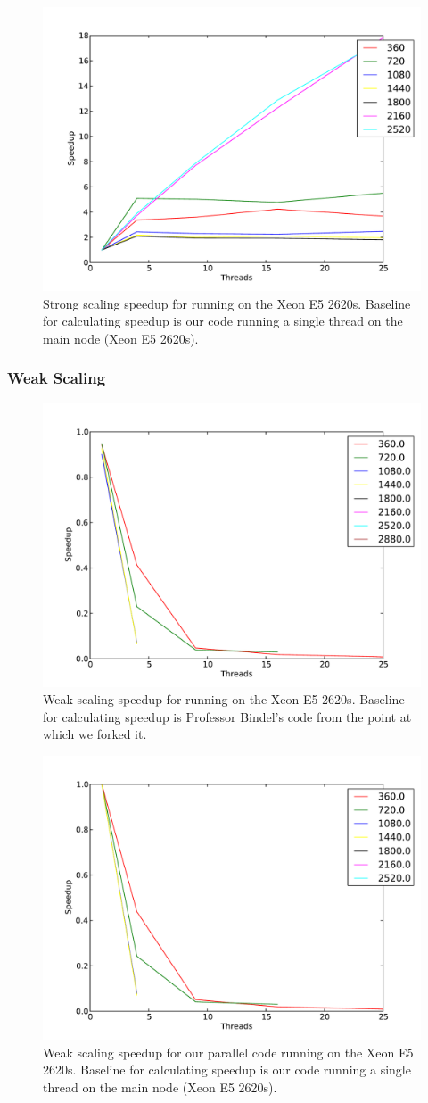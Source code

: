 \documentclass[11pt]{article}
\begin{document}
\begin{figure}[h!]
\includegraphics[width=0.5\linewidth]{e5_strong_e5_baseline.pdf}
\caption{Strong scaling speedup for running on the Xeon E5 2620s. Baseline for calculating speedup is our code running a single thread on the main node (Xeon E5 2620s).}
\end{figure}


\subsubsection{Weak Scaling}
\begin{figure}[h!]
\includegraphics[width=0.5\linewidth]{e5_weak_bindel_baseline.pdf}
\caption{Weak scaling speedup for running on the Xeon E5 2620s. Baseline for calculating speedup is Professor Bindel's code from the point at which we forked it.}
\end{figure}

\begin{figure}[h!]
\includegraphics[width=0.5\linewidth]{e5_weak_e5_baseline.pdf}
\caption{Weak scaling speedup for our parallel code running on the Xeon E5 2620s. Baseline for calculating speedup is our code running a single thread on the main node (Xeon E5 2620s).}
\end{figure}
\end{document}
